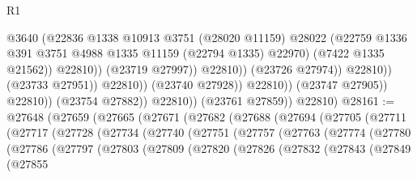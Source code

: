 \begin{lexlean}{R1}
\begin{coremodule}
                                                @3640
                                                (@22836
                                                  @1338
                                                  @10913
                                                  @3751
                                                  (@28020 @11159)
                                                  @28022
                                                  (@22759
                                                    @1336
                                                    @391
                                                    @3751
                                                    @4988
                                                    @1335
                                                    @11159
                                                    (@22794 @1335)
                                                    @22970)
                                                  (@7422 @1335 @21562))
                                                @22810))
                                            (@23719 @27997))
                                          @22810))
                                      (@23726 @27974))
                                    @22810))
                                (@23733 @27951))
                              @22810))
                          (@23740 @27928))
                        @22810))
                    (@23747 @27905))
                  @22810))
              (@23754 @27882))
            @22810))
        (@23761 @27859))
      @22810)
@28161 := @27648
    (@27659
      (@27665
        (@27671
          (@27682
            (@27688
              (@27694
                (@27705
                  (@27711
                    (@27717
                      (@27728
                        (@27734
                          (@27740
                            (@27751
                              (@27757
                                (@27763
                                  (@27774
                                    (@27780
                                      (@27786
                                        (@27797
                                          (@27803
                                            (@27809
                                              (@27820
                                                (@27826
                                                  (@27832
                                                    (@27843
                                                      (@27849
                                                        (@27855

\end{coremodule}
\end{lexlean}
